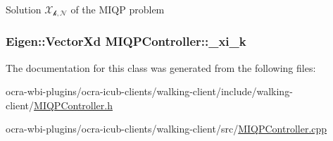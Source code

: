 \-Solution $\mathcal{X_{k,N}}$ of the \-M\-I\-Q\-P problem \hypertarget{classMIQPController_ad1c63725dab2ce84382fcb0b071325ed}{
\subsubsection[{\-\_\-xi\-\_\-k}]{\setlength{\rightskip}{0pt plus 5cm}\-Eigen\-::\-Vector\-Xd {\bf \-M\-I\-Q\-P\-Controller\-::\-\_\-xi\-\_\-k}}}\label{classMIQPController_ad1c63725dab2ce84382fcb0b071325ed}


\-The documentation for this class was generated from the following files\-:\begin{DoxyCompactItemize}
\item 
ocra-\/wbi-\/plugins/ocra-\/icub-\/clients/walking-\/client/include/walking-\/client/\hyperlink{MIQPController_8h}{\-M\-I\-Q\-P\-Controller.\-h}\item 
ocra-\/wbi-\/plugins/ocra-\/icub-\/clients/walking-\/client/src/\hyperlink{MIQPController_8cpp}{\-M\-I\-Q\-P\-Controller.\-cpp}\end{DoxyCompactItemize}
